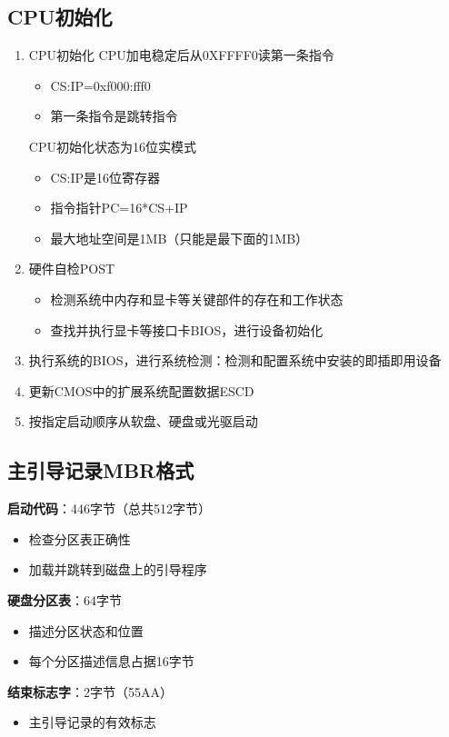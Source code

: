 \subsection{CPU初始化}
\begin{enumerate}
	\item CPU初始化
	\subitem CPU加电稳定后从0XFFFF0读第一条指令
	\begin{itemize}
		\item CS:IP=0xf000:fff0
		\item 第一条指令是跳转指令
	\end{itemize}

\subitem CPU初始化状态为16位实模式
\begin{itemize}
	\item CS:IP是16位寄存器
	\item 指令指针PC=16*CS+IP
	\item 最大地址空间是1MB（只能是最下面的1MB）
\end{itemize}
\item 硬件自检POST
\begin{itemize}
	\item 检测系统中内存和显卡等关键部件的存在和工作状态
	\item 查找并执行显卡等接口卡BIOS，进行设备初始化
\end{itemize}
\item 执行系统的BIOS，进行系统检测：检测和配置系统中安装的即插即用设备
\item 更新CMOS中的扩展系统配置数据ESCD
\item 按指定启动顺序从软盘、硬盘或光驱启动
\end{enumerate}
\subsection{主引导记录MBR格式}
\textbf{启动代码}：446字节（总共512字节）
\begin{itemize}
	\item 检查分区表正确性
	\item 加载并跳转到磁盘上的引导程序
\end{itemize}
\textbf{硬盘分区表}：64字节
\begin{itemize}
	\item 描述分区状态和位置
	\item 每个分区描述信息占据16字节
\end{itemize}
\textbf{结束标志字}：2字节（55AA）
\begin{itemize}
	\item 主引导记录的有效标志
\end{itemize}

